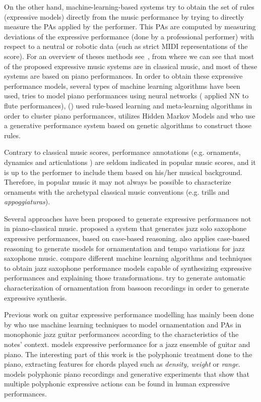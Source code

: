 On the other hand, machine-learning-based systems try to obtain the set of rules (expressive models) directly from the music performance by trying to directly measure the PAs applied by the performer. This PAs are computed by measuring deviations of the expressive performance (done by a professional performer) with respect to a neutral or robotic data (such as strict MIDI representations of the score). For an overview of theses methods see~\cite{Goebl2005}, from where we can see that most of the proposed expressive music systems are in classical music, and most of these systems are based on piano performances. In order to obtain these expressive performance models, several types of machine learning algorithms have been used, \cite{Bresin1998} tries to model piano performances using neural networks (\cite{Camurri2000} applied NN to flute performances), \cite{Widmer2003a} (\cite{Widmer2003}) used rule-based learning and meta-learning algorithms in order to cluster piano performances, \cite{Grindlay2006} utilizes Hidden Markov Models and \cite{Miranda2010} who use a generative performance system based on genetic algorithms to construct those rules. 

Contrary to classical music scores, performance annotations (e.g. ornaments, dynamics and articulations ) are seldom indicated in popular music scores, and it is up to the performer to include them based on his/her musical background. Therefore, in popular music it may not always be possible to characterize ornaments with the archetypal classical music conventions (e.g. trills and \textit{appoggiaturas}). 

Several approaches have been proposed to generate expressive performances not in piano-classical music. \cite{Arcos1998} proposed a system that generates jazz solo saxophone expressive performances, based on case-based reasoning. \cite{Grachten2006} also applies case-based reasoning to generate models for ornamentation and tempo variations for jazz saxophone music. \cite{Ramirez2006} compare different machine learning algorithms and techniques to obtain jazz saxophone performance models capable of synthesizing expressive performances and explaining those transformations. \cite{Puiggros2006} try to generate automatic characterization of ornamentation from bassoon recordings in order to generate expressive synthesis.

Previous work on guitar expressive performance modelling has mainly been done by \cite{Giraldo2016} who use machine learning techniques to model ornamentation and PAs in monophonic jazz guitar performances according to the characteristics of the notes' context.
\cite{bantula2016} models expressive performance for a jazz ensemble of guitar and piano. The interesting part of this work is the polyphonic treatment done to the piano, extracting features for chords played such as \textit{density, weight} or \textit{range}. \cite{KirkeAlexisMiranda2013} models polyphonic piano recordings and generative experiments that show that multiple polyphonic expressive actions can be found in human expressive performances. 
\cleardoublepage